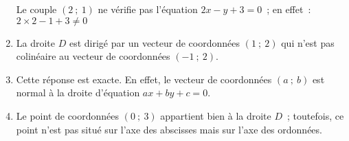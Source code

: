 \begin{corrige}
\begin{enumerate}[label=\alph*.]
          Le couple $\left( 2~;~1 \right)$ ne vérifie pas l'équation  $2x - y+3=0$~; en effet~:
          \newpar
          $2 \times 2 - 1+3 \neq 0$
          \item
          La droite $D$ est dirigé par un vecteur de coordonnées $(  1~;~2 )$ qui n'est pas colinéaire au vecteur de coordonnées  $(  - 1~;~2 ).$
          \item
          Cette réponse est exacte. En effet, le vecteur de coordonnées  $( a~;~b )$ est normal à la droite d'équation $ax+by+c=0.$
          \item
          Le point de coordonnées $( 0~;~3 )$ appartient bien à la droite $D$~; toutefois, ce point n'est pas situé sur l'axe des abscisses mais sur l'axe des ordonnées.
     \end{enumerate}
\end{corrige}
